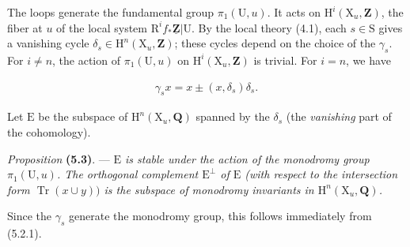 \documentclass[10pt,leqno]{article}
\begin{document}
\begin{center}
\end{center}

\noindent The loops generate the fundamental group \(\pi _{1}(\mathrm{U},u)\). It acts on \(\mathrm{H}^{i}(\mathrm{X}_{u},\mathbf{Z})\), the fiber at \(u\) of the local system \(\mathrm{R}^{i} f_{*}\underline{\mathbf{Z}}|\mathrm{U}\). By the local theory (4.1), each \(s\in \mathrm{S}\) gives a vanishing cycle \(\delta _{s}\in \mathrm{H}^{n}(\mathrm{X}_{u},\mathbf{Z})\); these cycles depend on the choice of the \(\gamma _{s}\). For \(i\ne n\), the action of \(\pi _{1}(\mathrm{U},u)\) on \(\mathrm{H}^{i}(\mathrm{X}_{u},\mathbf{Z})\) is trivial. For \(i=n\), we have\par

\begin{equation*}\begin{gathered}\gamma _{s} x = x \pm  (x,\delta _{s})\delta _{s}.\end{gathered}\tag{5.2.1}\end{equation*}

\noindent Let \(\mathrm{E}\) be the subspace of \(\mathrm{H}^{n}(\mathrm{X}_{u},\mathbf{Q})\) spanned by the \(\delta _{s}\) (the \emph{vanishing} part of the cohomology).\par

\noindent \emph{Proposition} \textbf{(5.3)}. — {\itshape \(\mathrm{E}\) is stable under the action of the monodromy group \(\pi _{1}(\mathrm{U},u)\). The orthogonal complement \(\mathrm{E}^{\perp }\) of \(\mathrm{E}\) (with respect to the intersection form \(\operatorname{Tr}(x\cup y))\) is the subspace of monodromy invariants in \(\mathrm{H}^{n}(\mathrm{X}_{u},\mathbf{Q})\).}\par

\noindent Since the \(\gamma _{s}\) generate the monodromy group, this follows immediately from (5.2.1).\par
\end{document}
